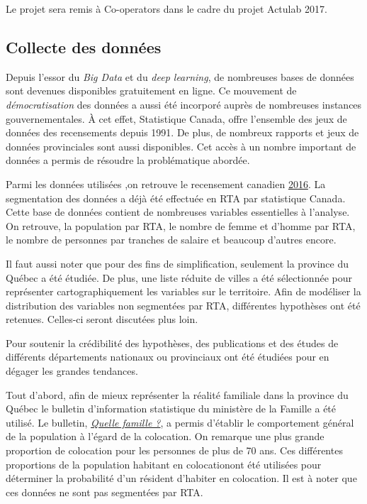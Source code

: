 \documentclass[11pt,french]{article}\usepackage[]{graphicx}\usepackage[]{color}
\begin{document}
Le projet sera remis à Co-operators dans le cadre du projet Actulab 2017.

\subsection*{Collecte des données}

Depuis l'essor du \emph{Big Data} et du \emph{deep learning}, de nombreuses bases de données sont devenues disponibles gratuitement en ligne. Ce mouvement de \emph{démocratisation} des données a aussi été incorporé auprès de nombreuses instances gouvernementales. À cet effet, Statistique Canada, offre l'ensemble des jeux de données des recensements depuis 1991. De plus, de nombreux rapports et jeux de données provinciales sont aussi disponibles. Cet accès à un nombre important de données a permis de résoudre la problématique abordée.
\newline

Parmi les données utilisées ,on retrouve le recensement canadien \href{http://www12.statcan.gc.ca/census-recensement/2016/dp-pd/prof/details/download-telecharger/comp/page_dl-tc.cfm?Lang=F}{2016}.  La segmentation des données a déjà été effectuée en RTA par statistique Canada. Cette base de données contient de nombreuses variables essentielles à l’analyse. On retrouve, la population par RTA, le nombre de femme et d’homme par RTA, le nombre de personnes par tranches de salaire et beaucoup d’autres encore.
\newline

Il faut aussi noter que pour des fins de simplification, seulement la province du Québec a été étudiée. De plus, une liste réduite de villes a été sélectionnée pour représenter cartographiquement les variables sur le territoire. Afin de modéliser la distribution des variables non segmentées par RTA, différentes hypothèses ont été retenues. Celles-ci seront discutées plus loin. 
\newline

Pour soutenir la crédibilité des hypothèses, des publications et des études de différents départements nationaux ou provinciaux ont été étudiées pour en dégager les grandes tendances. 
\newline

Tout d'abord, afin de mieux représenter la réalité familiale dans la province du Québec le bulletin d'information statistique du ministère de la Famille a été utilisé. Le bulletin, \href{https://www.mfa.gouv.qc.ca/fr/Famille/chiffres-famille-quebec/bulletin_quelle_famille/Pages/aut2013_no1_tab4.aspx}{\emph{Quelle famille ?}}, a permis d'établir le comportement général de la population à l'égard de la colocation. On remarque une plus grande proportion de colocation pour les personnes de plus de 70 ans. Ces différentes proportions de la population habitant en colocationont été utilisées pour déterminer la probabilité d'un résident d'habiter en colocation. Il est à noter que ces données ne sont pas segmentées par RTA.
\newline
\end{document}

